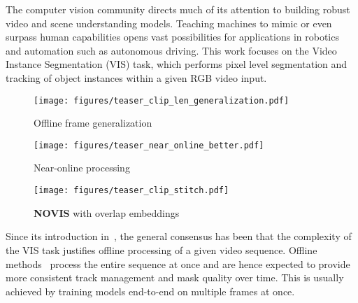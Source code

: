 \documentclass{article}
\newcommand{\method}{\mbox{NOVIS}}
\theoremstyle{plain}
\theoremstyle{definition}
\theoremstyle{remark}
\begin{document}
The computer vision community directs much of its attention to building robust video and scene understanding models.
Teaching machines to mimic or even surpass human capabilities opens vast possibilities for applications in robotics and automation such as autonomous driving.
This work focuses on the Video Instance Segmentation (VIS) task, which performs pixel level segmentation and tracking of object instances within a given RGB video input.
\begin{figure*}[t]
\centering
     \begin{subfigure}[t]{0.32\textwidth}
      \texttt{[image: figures/teaser\_clip\_len\_generalization.pdf]}
\caption{Offline frame generalization}
      \label{fig:teaser_offline}
    \end{subfigure}
    \begin{subfigure}[t]{0.32\textwidth}
      \texttt{[image: figures/teaser\_near\_online\_better.pdf]}
      \caption{Near-online processing}
      \label{fig:teaser_near_online}
    \end{subfigure}
    \begin{subfigure}[t]{0.335\textwidth}
      \texttt{[image: figures/teaser\_clip\_stitch.pdf]}
      \caption{\textbf{\method{}} with overlap embeddings}
      \label{fig:teaser_novis}
    \end{subfigure}
    \caption{
A \textbf{frame processing analysis} and comparison of our near-online \method{} approach with comparable online and offline baselines.
We evaluate on a 2-fold training and the official validation split of OVIS.
Figure (a) illustrates the training to test frame generalization gap of offline methods and the superiority of online methods recently observed by the VIS community.
The near-online variants shown in (b) do not suffer from the gap and outperform online baseline.
In Figure (c), we demonstrate how \method{} outperforms online and offline approaches and benefits from computing \emph{overlap embeddings}.
}
    \label{fig:teaser}
\end{figure*} Since its introduction in~\cite{Yang2019vis}, the general consensus has been that the complexity of the VIS task justifies offline processing of a given video sequence.
Offline methods~\cite{stem_seg,mask_prop,prop_reduce,stmask,sg_net,seqformer,IFC,heo2022vita,mask2former4vis} process the entire sequence at once and are hence expected to provide more consistent track management and mask quality over time.
This is usually achieved by training models end-to-end on multiple frames at once.
\end{document}
